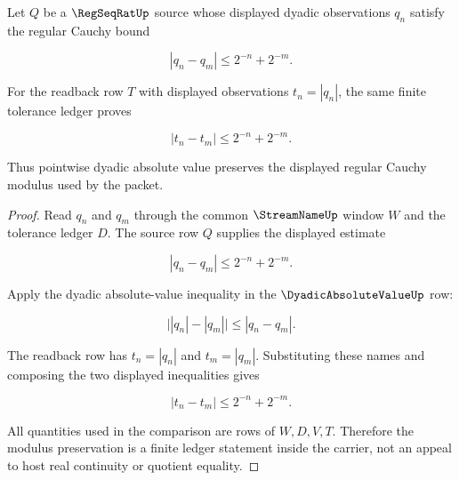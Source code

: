 \begin{theorem}
\label{thm:regular-cauchy-absolute-value-regularity-bound}
Let $Q$ be a $\RegSeqRatUp$ source whose displayed dyadic observations $q_n$ satisfy the regular Cauchy bound

$$
|q_n-q_m|\leq 2^{-n}+2^{-m}.
$$

For the readback row $T$ with displayed observations $t_n=|q_n|$, the same finite tolerance ledger proves

$$
|t_n-t_m|\leq 2^{-n}+2^{-m}.
$$

Thus pointwise dyadic absolute value preserves the displayed regular Cauchy modulus used by the packet.
\end{theorem}
\begin{proof}
Read $q_n$ and $q_m$ through the common $\StreamNameUp$ window $W$ and the tolerance ledger $D$. The source row $Q$ supplies the displayed estimate

$$
|q_n-q_m|\leq 2^{-n}+2^{-m}.
$$

Apply the dyadic absolute-value inequality in the $\DyadicAbsoluteValueUp$ row:

$$
\bigl||q_n|-|q_m|\bigr|\leq |q_n-q_m|.
$$

The readback row has $t_n=|q_n|$ and $t_m=|q_m|$. Substituting these names and composing the two displayed inequalities gives

$$
|t_n-t_m|\leq 2^{-n}+2^{-m}.
$$

All quantities used in the comparison are rows of $W,D,V,T$. Therefore the modulus preservation is a finite ledger statement inside the carrier, not an appeal to host real continuity or quotient equality.
\end{proof}

